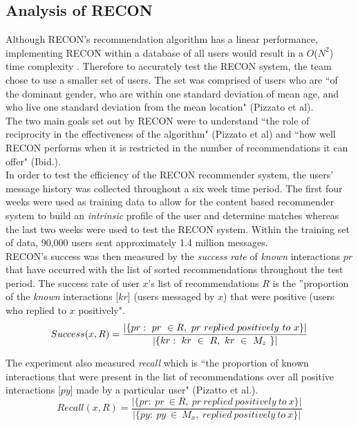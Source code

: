 \documentclass[11pt]{article}
\begin{document}
 \subsection{Analysis of RECON}
\indent Although RECON's recommendation algorithm has a linear performance, implementing RECON within a database of all users would result in a $O$($N^2$)  time complexity \cite{RECON}. Therefore to accurately test the RECON system, the team chose to use a smaller set of users. The set was comprised of users who are ``of the dominant gender, who are within one standard deviation of mean age, and who live one standard deviation from the mean location" (Pizzato et al). \\
\indent The two main goals set out by RECON were to understand ``the role of reciprocity in the effectiveness of the algorithm" (Pizzato et al) and ``how well RECON performs when it is restricted in the number of recommendations it can offer" (Ibid.). \\
\indent In order to test the efficiency of the RECON recommender system, the users' message history was collected throughout a six week time period. The first four weeks were used as training data to allow for the content based recommender system to build an \textit{intrinsic} profile of the user and determine matches whereas the last two weeks were used to test the RECON system. Within the training set of data, 90,000 users sent approximately 1.4 million messages.\\
\indent RECON's success was then measured by the \textit{success rate} of \textit{known} interactions $pr$ that have occurred with the list of sorted recommendations throughout the test period. The success rate of user $x$'s list of recommendations $R$ is the ''proportion of the \textit{known} interactions [$kr$] (users messaged by $x$) that were positive (users who replied to $x$ positively".
\begin{equation}
Success(x,R) = \frac{\lvert\{pr:\ pr\ \in R,\ pr\ replied\ positively\ to\ x\} \rvert}{\lvert \{kr:\ kr\ \in\ R,\ kr\ \in\ M_z\ \} \rvert}\\
\end{equation}

\indent The experiment also measured \textit{recall} which is ``the proportion of known interactions that were present in the list of recommendations over all positive interactions [$py$] made by a particular user" (Pizatto et al.).
\begin{equation}
Recall(x,R) = \frac{\lvert\{pr:\ pr\ \in R,\ pr\ replied\ positively\ to\ x\} \rvert}{\lvert \{py:\ py\ \in\ M_x,\ replied\ positively\ to\ x\} \rvert}
\end{equation}
\end{document}
